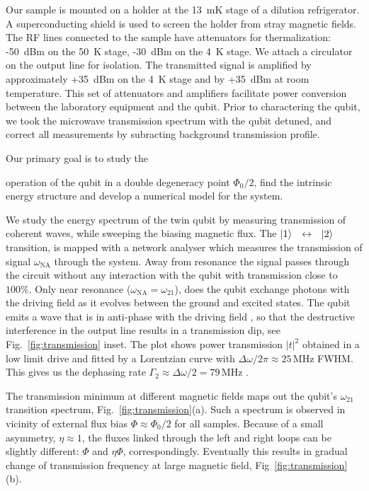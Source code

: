 \documentclass[%
reprint,
superscriptaddress,
bibnotes,
amsmath,
amssymb,
aps,
showkeys,
prb,
]{revtex4-2}
\newcommand{\iket}[1]{\ensuremath{\Ket{#1}}}
\newcommand{\ilra}{\ensuremath{\,\leftrightarrow\,}}
\begin{document}
Our sample is mounted on a holder at the 13~mK
stage of  a dilution refrigerator.  A  superconducting shield is used  to screen
the holder  from stray magnetic  fields.  The RF  lines connected to  the sample
have attenuators for thermalization: -50~dBm on  the 50~K stage, -30~dBm on the
4~K  stage.  We  attach a  circulator on  the output  line for  isolation.  The
transmitted signal is amplified  by approximately +35~dBm on the 4~K stage  and by +35~dBm at
room  temperature.  This  set  of attenuators  and  amplifiers facilitate  power
conversion  between the  laboratory equipment  and the qubit.  Prior  to
charactering the qubit,  we  took  the microwave  transmission
spectrum with the qubit detuned, and  correct all measurements by subracting background
transmission profile.

Our primary goal  is to study the

operation of the qubit in a double degeneracy point $\Phi_0/2$, find the intrinsic energy structure
and  develop a numerical model for the system.

We study the energy  spectrum  of the  twin qubit  by measuring transmission of coherent waves,  while  sweeping  the  biasing  magnetic flux.   
The  \iket{1}~\ilra~\iket{2}  transition, is  mapped  with a  network
analyser which measures  the transmission of signal  $\omega_{\text{NA}}$ through the
system.
Away from  resonance the signal passes through the  circuit without any
interaction with the qubit with transmission
close to  $ 100\% $.  Only near resonance  ($\omega_{\text{NA}}=\omega_{21}$), does the
qubit exchange photons  with the driving field as it  evolves between the ground
and excited states.  The  qubit emits a wave that is in anti-phase with
the driving  field \cite{Abdumalikov_2010}, so that the  destructive interference in
the output line results in  a transmission dip, see Fig.~\ref{fig:transmission} inset. The plot shows power transmission $|t|^2$ obtained in a low limit drive and fitted by a Lorentzian curve with 
$\Delta\omega/2\pi\approx25\,\text{MHz}$ FWHM. This gives us the dephasing rate $\Gamma_2 \approx \Delta\omega/2 = 79\,\text{MHz}$ 
\cite{Astafiev_2010}.  

The transmission minimum at different magnetic fields
maps   out   the   qubit's   $\omega_{21}$  transition   spectrum, Fig.~\ref{fig:transmission}(a). 
Such a spectrum is observed in vicinity of external flux bias $\Phi \approx \Phi_0/2$ for all samples. 
Because  of  a  small
asymmetry, $\eta\approx1$, the fluxes linked through  the left and right loops can be slightly
different: $ \Phi$ and $ \eta\Phi $, correspondingly. Eventually this results in gradual change of transmission frequency at large magnetic field, Fig~\ref{fig:transmission}(b).
\end{document}
